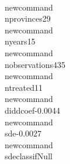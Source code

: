 \\newcommand{\\nprovinces}{29}
\\newcommand{\\nyears}{15}
\\newcommand{\\nobservations}{435}
\\newcommand{\\ntreated}{11}
\\newcommand{\\diddcoef}{-0.0044}
\\newcommand{\\sde}{-0.0027}
\\newcommand{\\sdeclassif}{Null}

